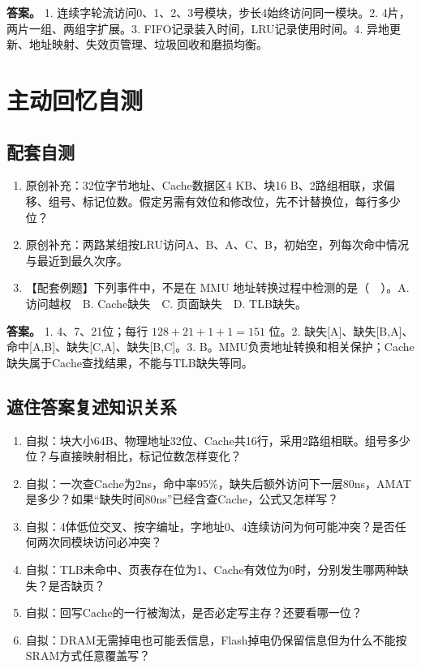 \textbf{答案。} 1. 连续字轮流访问0、1、2、3号模块，步长4始终访问同一模块。2. 4片，两片一组、两组字扩展。3. FIFO记录装入时间，LRU记录使用时间。4. 异地更新、地址映射、失效页管理、垃圾回收和磨损均衡。

\section{主动回忆自测}\label{CO03-recall}

\subsection{配套自测}\label{CO03-32}

\begin{enumerate}
\def\labelenumi{\arabic{enumi}.}
\tightlist
\item
  原创补充：32位字节地址、Cache数据区4 KB、块16 B、2路组相联，求偏移、组号、标记位数。假定另需有效位和修改位，先不计替换位，每行多少位？
\item
  原创补充：两路某组按LRU访问A、B、A、C、B，初始空，列每次命中情况与最近到最久次序。
\item
  【配套例题】下列事件中，不是在 MMU 地址转换过程中检测的是（　）。A. 访问越权　B. Cache缺失　C. 页面缺失　D. TLB缺失。
\end{enumerate}

\textbf{答案。} 1. 4、7、21位；每行 \(128+21+1+1=151\) 位。2. 缺失{[}A{]}、缺失{[}B,A{]}、命中{[}A,B{]}、缺失{[}C,A{]}、缺失{[}B,C{]}。3. B。MMU负责地址转换和相关保护；Cache缺失属于Cache查找结果，不能与TLB缺失等同。

\subsection{遮住答案复述知识关系}\label{CO03-recall-new}

\begin{recallcard}[主动回忆·自拟]

\begin{enumerate}
\def\labelenumi{\arabic{enumi}.}
\setcounter{enumi}{3}
\tightlist
\item
  自拟：块大小64B、物理地址32位、Cache共16行，采用2路组相联。组号多少位？与直接映射相比，标记位数怎样变化？
\item
  自拟：一次查Cache为2ns，命中率95\%，缺失后额外访问下一层80ns，AMAT是多少？如果``缺失时间80ns''已经含查Cache，公式又怎样写？
\item
  自拟：4体低位交叉、按字编址，字地址0、4连续访问为何可能冲突？是否任何两次同模块访问必冲突？
\item
  自拟：TLB未命中、页表存在位为1、Cache有效位为0时，分别发生哪两种缺失？是否缺页？
\item
  自拟：回写Cache的一行被淘汰，是否必定写主存？还要看哪一位？
\item
  自拟：DRAM无需掉电也可能丢信息，Flash掉电仍保留信息但为什么不能按SRAM方式任意覆盖写？
\end{enumerate}

\end{recallcard}


